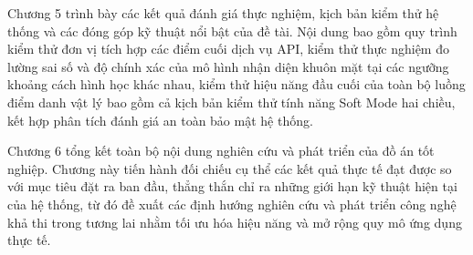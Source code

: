 \documentclass[../DoAn.tex]{subfiles}
\begin{document}
Chương 5 trình bày các kết quả đánh giá thực nghiệm, kịch bản kiểm thử hệ thống và các đóng góp kỹ thuật nổi bật của đề tài. Nội dung bao gồm quy trình kiểm thử đơn vị tích hợp các điểm cuối dịch vụ API, kiểm thử thực nghiệm đo lường sai số và độ chính xác của mô hình nhận diện khuôn mặt tại các ngưỡng khoảng cách hình học khác nhau, kiểm thử hiệu năng đầu cuối của toàn bộ luồng điểm danh vật lý bao gồm cả kịch bản kiểm thử tính năng Soft Mode hai chiều, kết hợp phân tích đánh giá an toàn bảo mật hệ thống.

Chương 6 tổng kết toàn bộ nội dung nghiên cứu và phát triển của đồ án tốt nghiệp. Chương này tiến hành đối chiếu cụ thể các kết quả thực tế đạt được so với mục tiêu đặt ra ban đầu, thẳng thắn chỉ ra những giới hạn kỹ thuật hiện tại của hệ thống, từ đó đề xuất các định hướng nghiên cứu và phát triển công nghệ khả thi trong tương lai nhằm tối ưu hóa hiệu năng và mở rộng quy mô ứng dụng thực tế.
\end{document}

